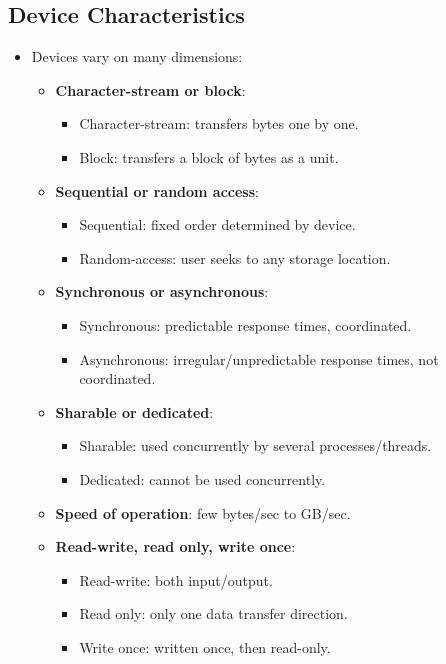 \subsection{Device Characteristics}
\begin{itemize}
    \item Devices vary on many dimensions:
    \begin{itemize}
        \item \textbf{Character-stream or block}:
        \begin{itemize}
            \item Character-stream: transfers bytes one by one.
            \item Block: transfers a block of bytes as a unit.
        \end{itemize}
        \item \textbf{Sequential or random access}:
        \begin{itemize}
            \item Sequential: fixed order determined by device.
            \item Random-access: user seeks to any storage location.
        \end{itemize}
        \item \textbf{Synchronous or asynchronous}:
        \begin{itemize}
            \item Synchronous: predictable response times, coordinated.
            \item Asynchronous: irregular/unpredictable response times, not coordinated.
        \end{itemize}
        \item \textbf{Sharable or dedicated}:
        \begin{itemize}
            \item Sharable: used concurrently by several processes/threads.
            \item Dedicated: cannot be used concurrently.
        \end{itemize}
        \item \textbf{Speed of operation}: few bytes/sec to GB/sec.
        \item \textbf{Read-write, read only, write once}:
        \begin{itemize}
            \item Read-write: both input/output.
            \item Read only: only one data transfer direction.
            \item Write once: written once, then read-only.
        \end{itemize}
    \end{itemize}
\end{itemize}

